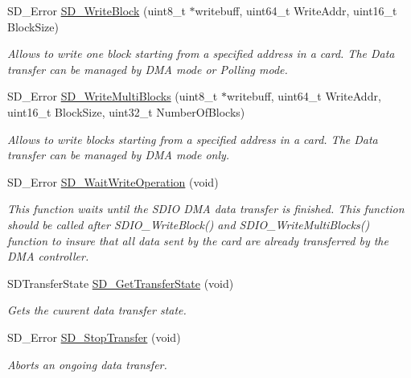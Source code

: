 \begin{DoxyCompactItemize}
S\+D\+\_\+\+Error \hyperlink{group___s_t_m324x_g___e_v_a_l___s_d_i_o___s_d___private___functions_gab1eef7c1ff23ea746db504463d301a8b}{S\+D\+\_\+\+Write\+Block} (uint8\+\_\+t $\ast$writebuff, uint64\+\_\+t Write\+Addr, uint16\+\_\+t Block\+Size)
\begin{DoxyCompactList}\small\item\em Allows to write one block starting from a specified address in a card. The Data transfer can be managed by D\+MA mode or Polling mode. \end{DoxyCompactList}\item 
S\+D\+\_\+\+Error \hyperlink{group___s_t_m324x_g___e_v_a_l___s_d_i_o___s_d___private___functions_ga64baac72a75a2c522e837935009cbe93}{S\+D\+\_\+\+Write\+Multi\+Blocks} (uint8\+\_\+t $\ast$writebuff, uint64\+\_\+t Write\+Addr, uint16\+\_\+t Block\+Size, uint32\+\_\+t Number\+Of\+Blocks)
\begin{DoxyCompactList}\small\item\em Allows to write blocks starting from a specified address in a card. The Data transfer can be managed by D\+MA mode only. \end{DoxyCompactList}\item 
S\+D\+\_\+\+Error \hyperlink{group___s_t_m324x_g___e_v_a_l___s_d_i_o___s_d___private___functions_gad55967ea67075f01671fb2144c7f7b0d}{S\+D\+\_\+\+Wait\+Write\+Operation} (void)
\begin{DoxyCompactList}\small\item\em This function waits until the S\+D\+IO D\+MA data transfer is finished. This function should be called after S\+D\+I\+O\+\_\+\+Write\+Block() and S\+D\+I\+O\+\_\+\+Write\+Multi\+Blocks() function to insure that all data sent by the card are already transferred by the D\+MA controller. \end{DoxyCompactList}\item 
S\+D\+Transfer\+State \hyperlink{group___s_t_m324x_g___e_v_a_l___s_d_i_o___s_d___private___functions_ga2dd79455185c28bd21964d113a38d110}{S\+D\+\_\+\+Get\+Transfer\+State} (void)
\begin{DoxyCompactList}\small\item\em Gets the cuurent data transfer state. \end{DoxyCompactList}\item 
S\+D\+\_\+\+Error \hyperlink{group___s_t_m324x_g___e_v_a_l___s_d_i_o___s_d___private___functions_gad3dc52f076ae8145e105cb4d8a37b043}{S\+D\+\_\+\+Stop\+Transfer} (void)
\begin{DoxyCompactList}\small\item\em Aborts an ongoing data transfer. \end{DoxyCompactList}\item 

\end{DoxyCompactItemize}
